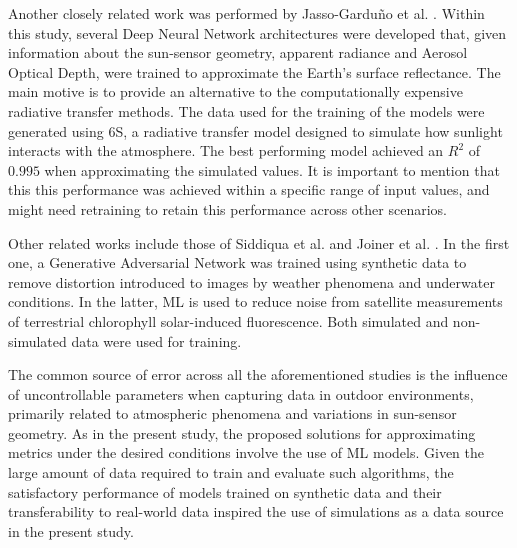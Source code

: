 Another closely related work was performed by Jasso-Garduño et al. \cite{dl-based-emul}. Within this study, several Deep Neural Network architectures were developed that, given information about the sun-sensor geometry, apparent radiance and Aerosol Optical Depth, were trained to approximate the Earth's surface reflectance. The main motive is to provide an alternative to the computationally expensive radiative transfer methods. The data used for the training of the models were generated using 6S, a radiative transfer model designed to simulate how sunlight interacts with the atmosphere. The best performing model achieved an $R^2$ of $0.995$ when approximating the simulated values. It is important to mention that this this performance was achieved within a specific range of input values, and might need retraining to retain this performance across other scenarios. 


Other related works include those of Siddiqua et al. \cite{macgan} and Joiner et al. \cite{noise-reduct-solar-ind}. In the first one, a Generative Adversarial Network was trained using synthetic data to remove distortion introduced to images by weather phenomena and underwater conditions. In the latter,  ML is used to reduce noise from satellite measurements of terrestrial chlorophyll solar-induced fluorescence. Both simulated and non-simulated data were used for training.

The common source of error across all the aforementioned studies is the influence of uncontrollable parameters when capturing data in outdoor environments, primarily related to atmospheric phenomena and variations in sun-sensor geometry. As in the present study, the proposed solutions for approximating metrics under the desired conditions involve the use of ML models. Given the large amount of data required to train and evaluate such algorithms, the satisfactory performance of models trained on synthetic data and their transferability to real-world data inspired the use of simulations as a data source in the present study.